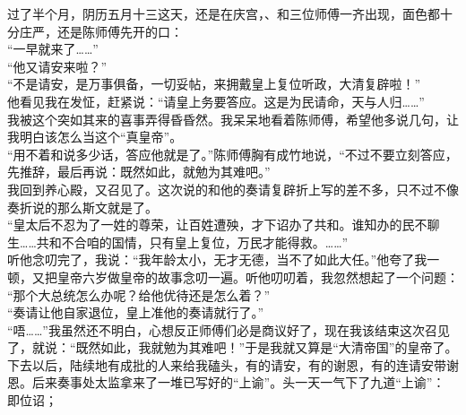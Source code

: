 过了半个月，阴历五月十三这天，还是在庆宫，、和三位师傅一齐出现，面色都十分庄严，还是陈师傅先开的口：\\

“一早就来了……”\\

“他又请安来啦？”\\

“不是请安，是万事俱备，一切妥帖，来拥戴皇上复位听政，大清复辟啦！”\\

他看见我在发怔，赶紧说：“请皇上务要答应。这是为民请命，天与人归……”\\

我被这个突如其来的喜事弄得昏昏然。我呆呆地看着陈师傅，希望他多说几句，让我明白该怎么当这个“真皇帝”。\\

“用不着和说多少话，答应他就是了。”陈师傅胸有成竹地说，“不过不要立刻答应，先推辞，最后再说：既然如此，就勉为其难吧。”\\

我回到养心殿，又召见了。这次说的和他的奏请复辟折上写的差不多，只不过不像奏折说的那么斯文就是了。\\

“皇太后不忍为了一姓的尊荣，让百姓遭殃，才下诏办了共和。谁知办的民不聊生……共和不合咱的国情，只有皇上复位，万民才能得救。……”\\

听他念叨完了，我说：“我年龄太小，无才无德，当不了如此大任。”他夸了我一顿，又把皇帝六岁做皇帝的故事念叨一遍。听他叨叨着，我忽然想起了一个问题：\\

“那个大总统怎么办呢？给他优待还是怎么着？”\\

“奏请让他自家退位，皇上准他的奏请就行了。”\\

“唔……”我虽然还不明白，心想反正师傅们必是商议好了，现在我该结束这次召见了，就说：“既然如此，我就勉为其难吧！”于是我就又算是“大清帝国”的皇帝了。\\

下去以后，陆续地有成批的人来给我磕头，有的请安，有的谢恩，有的连请安带谢恩。后来奏事处太监拿来了一堆已写好的“上谕”。头一天一气下了九道“上谕”：\\

即位诏；\\


